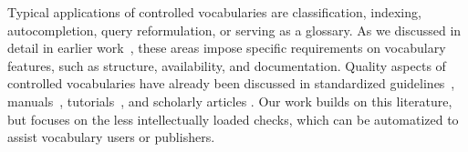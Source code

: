 





Typical applications of controlled vocabularies are classification, indexing, autocompletion, query reformulation, or serving as a glossary. As we discussed in detail in earlier work~\cite{Nagy2011}, these areas impose specific requirements on vocabulary features, such as structure, availability, and documentation. Quality aspects of controlled vocabularies have already been discussed in standardized guidelines~\cite{ISO25964-1:2011,Z39.19:2005}, manuals~\cite{Svenonius2003,Hedden2010,Aitchison2000,Harpring2010}, tutorials~\cite{Soergel2002}, and scholarly articles \cite{Coronado2009,Soergel1997,Elkin2002,Kless2010}. Our work builds on this literature, but focuses on the less intellectually loaded checks, which can be automatized to assist vocabulary users or publishers. 

